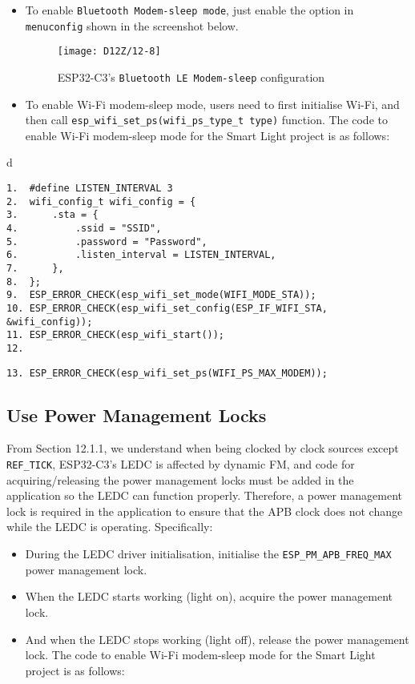 \documentclass[a4paper,12pt]{book}
\begin{document}
\begin{itemize}
    \item To enable \verb|Bluetooth Modem-sleep mode|, just enable the option in \verb|menuconfig| shown in the screenshot below.
    \begin{figure}[!h]
        \centering
        \texttt{[image: D12Z/12-8]}
        \caption{ESP32-C3’s \texttt{Bluetooth LE Modem-sleep} configuration}
    \end{figure}
    \item To enable Wi-Fi modem-sleep mode, users need to first initialise Wi-Fi, and then call \verb|esp_wifi_set_ps(wifi_ps_type_t type)| function. The code to enable Wi-Fi modem-sleep mode for the Smart Light project is as follows:
\end{itemize}

\begin{codebloc}
\begin{tabular}{d}
\vspace{2pt}
\begin{verbatim}
1.	#define LISTEN_INTERVAL 3
2.	wifi_config_t wifi_config = {
3. 	    .sta = {
4. 	        .ssid = "SSID",
5. 	        .password = "Password",
6. 	        .listen_interval = LISTEN_INTERVAL,
7. 	    },
8.	};
9.	ESP_ERROR_CHECK(esp_wifi_set_mode(WIFI_MODE_STA));
10. ESP_ERROR_CHECK(esp_wifi_set_config(ESP_IF_WIFI_STA, &wifi_config));
11. ESP_ERROR_CHECK(esp_wifi_start());
12.
\end{verbatim}
\verb|13. ESP_ERROR_CHECK(esp_wifi_set_ps(WIFI_PS_MAX_MODEM));|
\end{tabular}
\end{codebloc}

\subsection{Use Power Management Locks}
From Section 12.1.1, we understand when being clocked by clock sources except \verb|REF_TICK|, ESP32-C3’s LEDC is affected by dynamic FM, and code for acquiring/releasing the power management locks must be added in the application so the LEDC can function properly. Therefore, a power management lock is required in the application to ensure that the APB clock does not change while the LEDC is operating. Specifically: 

\begin{itemize}[leftmargin=1.5em]
    \item During the LEDC driver initialisation, initialise the \verb|ESP_PM_APB_FREQ_MAX| power management lock.
    \item When the LEDC starts working (light on), acquire the power management lock.
    \item And when the LEDC stops working (light off), release the power management lock. The code to enable Wi-Fi modem-sleep mode for the Smart Light project is as follows:
\end{itemize}
\end{document}
